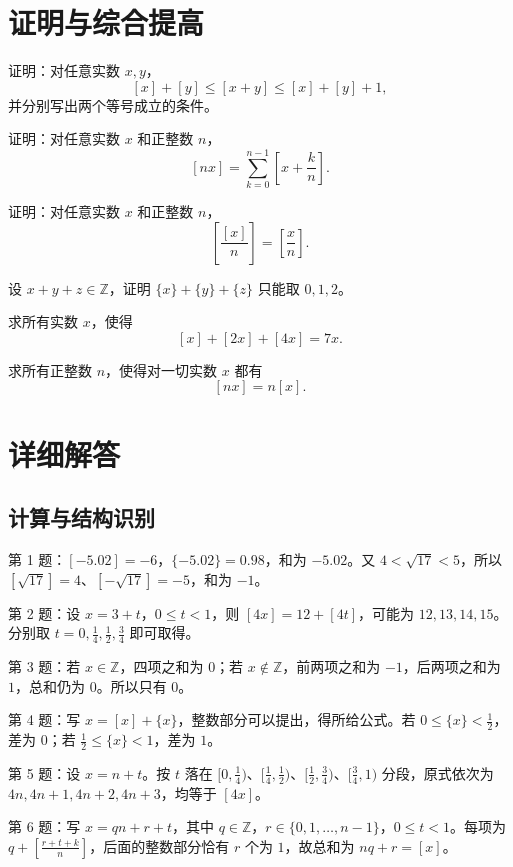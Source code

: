 \documentclass[11pt,a4paper,fontset=fandol]{ctexart}
\begin{document}
\section{证明与综合提高}
\begin{exercise}证明：对任意实数 $x,y$，
\[
[x]+[y]\le[x+y]\le[x]+[y]+1,
\]
并分别写出两个等号成立的条件。\end{exercise}
\begin{exercise}证明：对任意实数 $x$ 和正整数 $n$，
\[
[nx]=\sum_{k=0}^{n-1}\left[x+\frac{k}{n}\right].
\]\end{exercise}
\begin{exercise}证明：对任意实数 $x$ 和正整数 $n$，
\[
\left[\frac{[x]}{n}\right]=\left[\frac{x}{n}\right].
\]\end{exercise}
\begin{exercise}设 $x+y+z\in\mathbb Z$，证明 $\{x\}+\{y\}+\{z\}$ 只能取 $0,1,2$。\end{exercise}
\begin{exercise}求所有实数 $x$，使得
\[
[x]+[2x]+[4x]=7x.
\]\end{exercise}
\begin{exercise}求所有正整数 $n$，使得对一切实数 $x$ 都有
\[
[nx]=n[x].
\]\end{exercise}

\newpage
\section{详细解答}
\subsection{计算与结构识别}
\begin{solution}第 1 题：$[-5.02]=-6$，$\{-5.02\}=0.98$，和为 $-5.02$。又 $4<\sqrt{17}<5$，所以 $[\sqrt{17}]=4$、$[-\sqrt{17}]=-5$，和为 $-1$。\end{solution}
\begin{solution}第 2 题：设 $x=3+t$，$0\le t<1$，则 $[4x]=12+[4t]$，可能为 $12,13,14,15$。分别取 $t=0,\frac14,\frac12,\frac34$ 即可取得。\end{solution}
\begin{solution}第 3 题：若 $x\in\mathbb Z$，四项之和为 $0$；若 $x\notin\mathbb Z$，前两项之和为 $-1$，后两项之和为 $1$，总和仍为 $0$。所以只有 $0$。\end{solution}
\begin{solution}第 4 题：写 $x=[x]+\{x\}$，整数部分可以提出，得所给公式。若 $0\le\{x\}<\frac12$，差为 $0$；若 $\frac12\le\{x\}<1$，差为 $1$。\end{solution}
\begin{solution}第 5 题：设 $x=n+t$。按 $t$ 落在 $[0,\frac14)$、$[\frac14,\frac12)$、$[\frac12,\frac34)$、$[\frac34,1)$ 分段，原式依次为 $4n,4n+1,4n+2,4n+3$，均等于 $[4x]$。\end{solution}
\begin{solution}第 6 题：写 $x=qn+r+t$，其中 $q\in\mathbb Z$，$r\in\{0,1,\ldots,n-1\}$，$0\le t<1$。每项为 $q+[\frac{r+t+k}{n}]$，后面的整数部分恰有 $r$ 个为 $1$，故总和为 $nq+r=[x]$。\end{solution}
\end{document}
